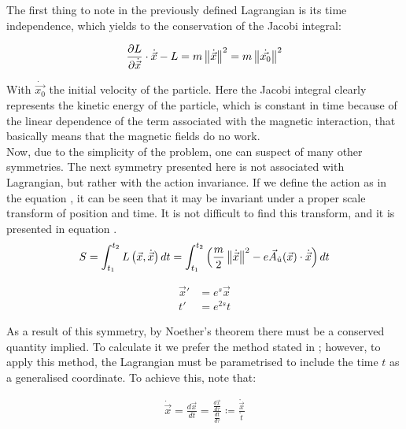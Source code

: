 The first thing to note in the previously defined Lagrangian is its time independence, which yields to the conservation of the Jacobi integral:

\begin{equation*}
 \frac{\partial L}{\partial\dot{\vec{x}}}\cdot\dot{\vec{x}} - L = m\left\lVert \dot{\vec{x}} \right\rVert^2                    =m\left\lVert \dot{\vec{x_0}} \right\rVert^2 
\end{equation*}

With $\dot{\vec{x_0}}$ the initial velocity of the particle. Here the Jacobi integral clearly represents the kinetic energy of the particle, which is constant in time because of the linear dependence of the term associated with the magnetic interaction, that basically means that the magnetic fields do no work.\\

Now, due to the simplicity of the problem, one can suspect of many other symmetries. The next symmetry presented here is not associated with Lagrangian, but rather with the action invariance. If we define the action as in the equation , it can be seen that it may be invariant under a proper scale transform of position and time. It is not difficult to find this transform, and it is presented in equation .\\

\begin{equation}
S = \int_{t_1}^{t_2}L\left( \vec{x},\dot{\vec{x}} \right)dt = \int_{t_1}^{t_2}\left( \frac{m}{2}\left\lVert \dot{\vec{x}} \right\rVert^2 - e\vec{A}_{\hat{u}}(\vec{x})\cdot\dot{\vec{x}} \right)dt 
\label{eq:action}
\end{equation}

\begin{equation}
\begin{aligned}
\vec{x}' &= e^{s}\vec{x}\\
t'&= e^{2s}t
\end{aligned}
\label{eq:scaletrans}
\end{equation}

As a result of this symmetry, by Noether's theorem there must be a conserved quantity implied. To calculate it we prefer the method stated in \cite[Thm (dontforget)]{scheck}; however, to apply this method, the Lagrangian must be parametrised to include the time $t$ as a generalised coordinate. To achieve this, note that:

\begin{align*}
\dot{\vec{x}} = \frac{d\vec{x}}{dt} = \frac{\frac{d\vec{x}}{d\tau}}{\frac{dt}{d\tau}} \coloneqq \frac{\mathring{\vec{x}}}{\mathring{t}}
\end{align*}

